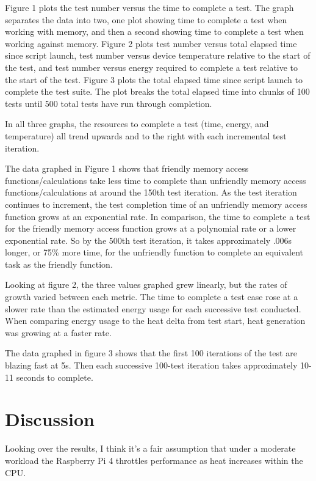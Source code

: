 \documentclass[journal]{IEEEtran}
\begin{document}
    Figure 1 plots the test number versus the time to complete a test. The graph separates the data into two, one plot showing time to complete a test when working with memory, and then a second showing time to complete a test when working against memory.
    Figure 2 plots test number versus total elapsed time since script launch, test number versus device temperature relative to the start of the test, and test number versus energy required to complete a test relative to the start of the test. 
    Figure 3 plots the total elapsed time since script launch to complete the test suite. The plot breaks the total elapsed time into chunks of 100 tests until 500 total tests have run through completion.

    In all three graphs, the resources to complete a test (time, energy, and temperature) all trend upwards and to the right with each incremental test iteration.

    The data graphed in Figure 1 shows that friendly memory access functions/calculations take less time to complete than unfriendly memory access functions/calculations at around the 150th test iteration.
    As the test iteration continues to increment, the test completion time of an unfriendly memory access function grows at an exponential rate. 
    In comparison, the time to complete a test for the friendly memory access function grows at a polynomial rate or a lower exponential rate.
    So by the 500th test iteration, it takes approximately .006s longer, or 75\% more time, for the unfriendly function to complete an equivalent task as the friendly function.

    Looking at figure 2, the three values graphed grew linearly, but the rates of growth varied between each metric. 
    The time to complete a test case rose at a slower rate than the estimated energy usage for each successive test conducted. 
    When comparing energy usage to the heat delta from test start, heat generation was growing at a faster rate. 

    The data graphed in figure 3 shows that the first 100 iterations of the test are blazing fast at 5s. 
    Then each successive 100-test iteration takes approximately 10-11 seconds to complete.


    \section{Discussion}
    Looking over the results, I think it's a fair assumption that under a moderate workload the Raspberry Pi 4 throttles performance as heat increases within the CPU.
\end{document}
